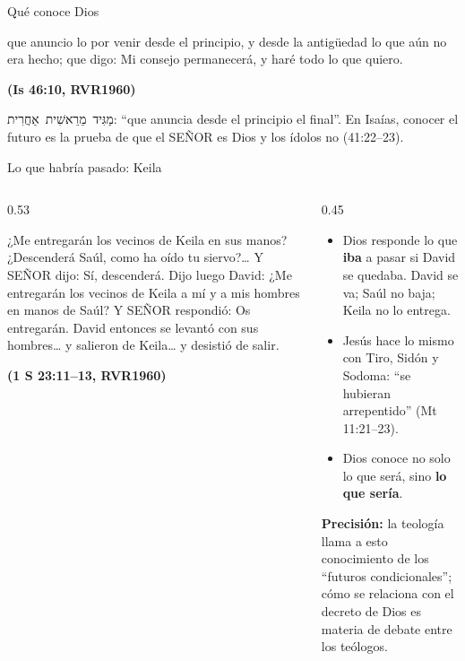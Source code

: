 \documentclass[hyperref={bookmarks=false},aspectratio=169]{beamer}
\newcommand{\heb}[1]{\mbox{\foreignlanguage{hebrew}{#1}}}
\newcommand{\SENOR}{S{\fontsize{0.78em}{1em}\selectfont EÑOR}}
\newcommand{\fuente}[1]{\par\hfill{\upshape\bfseries\footnotesize\textcolor{azul}{#1}}}
\newcommand{\destacar}[1]{\textbf{\textcolor{azul}{#1}}}
\newcommand{\precision}[1]{{\footnotesize\color{gris}\textbf{Precisión:} #1}}
\begin{document}
\begin{frame}{Qué conoce Dios}
\centering
{}\par\medskip
\begin{cita}que anuncio lo por venir desde el principio, y desde la antigüedad lo que aún no era hecho; que digo: Mi consejo permanecerá, y haré todo lo que quiero.\fuente{(Is 46:10, RVR1960)}\end{cita}
\scriptsize\heb{מַגִּיד מֵרֵאשִׁית אַחֲרִית}: ``que anuncia desde el principio el final''. En Isaías, conocer el futuro es la prueba de que el \SENOR{} es Dios y los ídolos no (41:22--23).
\end{frame}

\begin{frame}{Lo que habría pasado: Keila}
\begin{columns}[t,onlytextwidth]
\begin{column}{0.53\textwidth}
\begin{cita}¿Me entregarán los vecinos de Keila en sus manos? ¿Descenderá Saúl, como ha oído tu siervo?\ldots{} Y \SENOR{} dijo: Sí, descenderá. Dijo luego David: ¿Me entregarán los vecinos de Keila a mí y a mis hombres en manos de Saúl? Y \SENOR{} respondió: Os entregarán. David entonces se levantó con sus hombres\ldots{} y salieron de Keila\ldots{} y desistió de salir.\fuente{(1 S 23:11--13, RVR1960)}\end{cita}
\end{column}
\begin{column}{0.45\textwidth}\small
\begin{itemize}
\item Dios responde lo que \destacar{iba} a pasar si David se quedaba. David se va; Saúl no baja; Keila no lo entrega.
\item Jesús hace lo mismo con Tiro, Sidón y Sodoma: ``se hubieran arrepentido'' (Mt 11:21--23).
\item Dios conoce no solo lo que será, sino \destacar{lo que sería}.
\end{itemize}
\precision{la teología llama a esto conocimiento de los ``futuros condicionales''; cómo se relaciona con el decreto de Dios es materia de debate entre los teólogos.}
\end{column}
\end{columns}
\end{frame}
\end{document}
